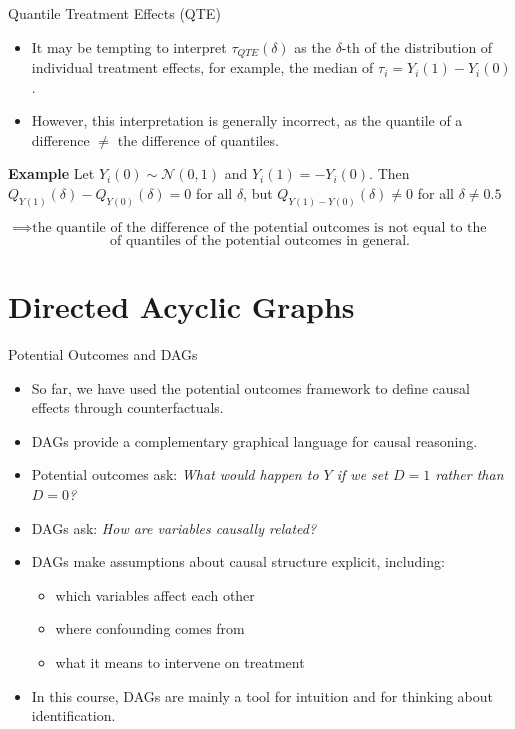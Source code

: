 \documentclass[11pt,aspectratio=169]{beamer}
\begin{document}
\begin{frame}{Quantile Treatment Effects (QTE)}

\begin{itemize}
    \item It may be tempting to interpret $\tau_{QTE}(\delta)$ as the $\delta$-th of the distribution of individual treatment effects, for example, the median of $\tau_i = Y_i(1) - Y_i(0)$.
    \item However, this interpretation is generally incorrect, as the quantile of a difference $\neq$ the difference of quantiles.
\end{itemize}

\textbf{Example}
Let $Y_i(0) \sim \mathcal{N}(0, 1)$ and $Y_i(1) = -Y_i(0)$.
Then $Q_{Y(1)}(\delta) - Q_{Y(0)}(\delta) = 0$ for all $\delta$, but $Q_{Y(1)-Y(0)}(\delta) \neq 0$ for all $\delta \neq 0.5$

$$\implies \text{the quantile of the difference of the potential outcomes is not equal to the difference}$$
$$\text{of quantiles of the potential outcomes in general.}$$

\end{frame}


\begin{frame}


\end{frame}


\section{Directed Acyclic Graphs}
\begin{frame}{Potential Outcomes and DAGs}

\begin{itemize}
    \item So far, we have used the potential outcomes framework to define causal effects through counterfactuals.
    \item DAGs provide a complementary graphical language for causal reasoning.
    \item Potential outcomes ask: \emph{What would happen to $Y$ if we set $D = 1$ rather than $D = 0$?}
    \item DAGs ask: \emph{How are variables causally related?}
    \item DAGs make assumptions about causal structure explicit, including:
    \begin{itemize}
        \item[\blacksquare] which variables affect each other
        \item[\blacksquare] where confounding comes from
        \item[\blacksquare] what it means to intervene on treatment
    \end{itemize}
    \item In this course, DAGs are mainly a tool for intuition and for thinking about identification.
\end{itemize}

\end{frame}
\end{document}
